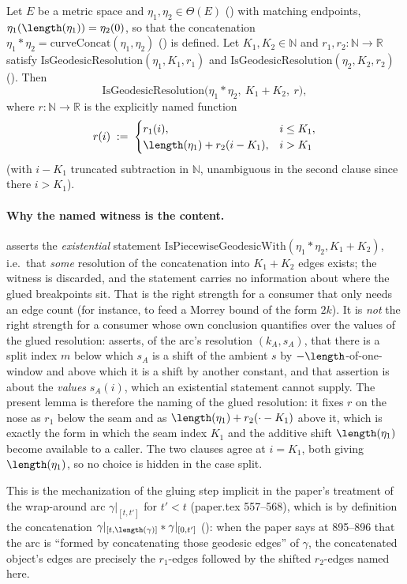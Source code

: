 \begin{lemma}
  Let $E$ be a metric space and $\eta_1,\eta_2 \in \Theta(E)$ () with matching
  endpoints, $\eta_1(\length(\eta_1)) = \eta_2(0)$, so that the concatenation $\eta_1 * \eta_2 =
  \mathrm{curveConcat}(\eta_1,\eta_2)$ () is defined. Let $K_1,K_2 \in
  \mathbb{N}$ and $r_1,r_2 \colon \mathbb{N} \to \mathbb{R}$ satisfy
  $\mathrm{IsGeodesicResolution}(\eta_1,K_1,r_1)$ and
  $\mathrm{IsGeodesicResolution}(\eta_2,K_2,r_2)$ (). Then
  \[
    \mathrm{IsGeodesicResolution}\bigl(\eta_1 * \eta_2,\ K_1+K_2,\ r\bigr),
  \]
  where $r \colon \mathbb{N} \to \mathbb{R}$ is the explicitly named function
  \[
    r(i) \;:=\;
    \begin{cases}
      r_1(i), & i \le K_1,\\
      \length(\eta_1) + r_2(i-K_1), & i > K_1
    \end{cases}
  \]
  (with $i-K_1$ truncated subtraction in $\mathbb{N}$, unambiguous in the second clause since there
  $i>K_1$).

  \paragraph{Why the named witness is the content.}  asserts the
  \emph{existential} statement $\mathrm{IsPiecewiseGeodesicWith}(\eta_1*\eta_2,K_1+K_2)$, i.e.\ that
  \emph{some} resolution of the concatenation into $K_1+K_2$ edges exists; the witness is
  discarded, and the statement carries no information about where the glued breakpoints sit. That
  is the right strength for a consumer that only needs an edge count (for instance, to feed a
  Morrey bound of the form $2k$). It is \emph{not} the right strength for a consumer whose own
  conclusion quantifies over the values of the glued resolution: 
  asserts, of the arc's resolution $(k_A,s_A)$, that there is a split index $m$ below which $s_A$
  is a shift of the ambient $s$ by $-\length$-of-one-window and above which it is a shift by
  another constant, and that assertion is about the \emph{values} $s_A(i)$, which an existential
  statement cannot supply. The present lemma is therefore the naming of the glued resolution: it
  fixes $r$ on the nose as $r_1$ below the seam and as $\length(\eta_1)+r_2(\cdot-K_1)$ above it,
  which is exactly the form in which the seam index $K_1$ and the additive shift
  $\length(\eta_1)$ become available to a caller. The two clauses agree at $i=K_1$, both giving
  $\length(\eta_1)$, so no choice is hidden in the case split.

  This is the mechanization of the gluing step implicit in the paper's treatment of the
  wrap-around arc $\gamma|_{[t,t']}$ for $t'<t$ (paper.tex 557--568), which is by definition the
  concatenation $\gamma|_{[t,\length(\gamma)]} * \gamma|_{[0,t']}$
  (): when the paper says at 895--896 that the arc is ``formed by
  concatenating those geodesic edges'' of $\gamma$, the concatenated object's edges are precisely
  the $r_1$-edges followed by the shifted $r_2$-edges named here.
\end{lemma}
